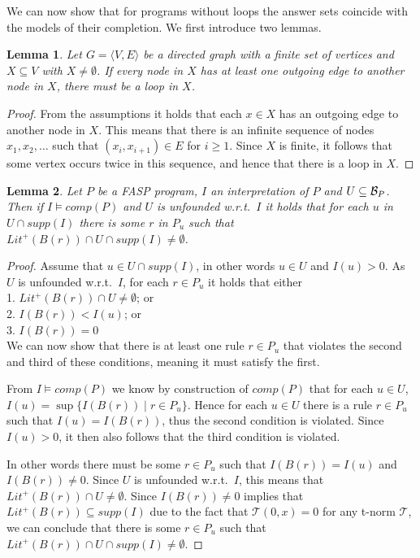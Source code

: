 \documentclass{tlp}
\newcommand{\hbase}[1]{{\ensuremath{{\cal B}_{#1}}}}
\newcommand{\body}[1]{\ensuremath{B(#1)}}
\newcommand{\comp}[1]{\ensuremath{comp(#1)}}
\newcommand{\poslit}[1]{\ensuremath{Lit^{+}(#1)}}
\newcommand{\posbody}[1]{\ensuremath{\poslit{\body{#1}}}}
\newcommand{\supp}[1]{\ensuremath{\mathit{supp}(#1)}}
\newcommand{\pretnorm}{\mathcal{T}}
\newcommand{\tuple}[1]{\ensuremath{\langle{#1}\rangle}}
\newtheorem{lemma}{Lemma}
\begin{document}
We can now show that for programs without loops the answer sets coincide with the models of their completion. We first introduce two lemmas.

\begin{lemma}\label{lem:noloop-modelcomp-is-ansset-1}
 Let $G = \tuple{V,E}$ be a directed graph with a finite set of vertices and $X \subseteq V$ with $X \neq \emptyset$. If every node in $X$ has at least one outgoing edge to another node in $X$, there must be a loop in $X$.
\end{lemma}
\begin{proof}
 From the assumptions it holds that each $x \in X$ has an outgoing edge to another node in $X$. This means that there is an infinite sequence of nodes $x_1,x_2,\ldots$ such that $(x_i,x_{i+1}) \in E$ for $i \geq 1$. Since $X$ is finite, it follows that some vertex occurs twice in this sequence, and hence that there is a loop in $X$.
\end{proof}

\begin{lemma}\label{lem:noloop-modelcomp-is-ansset-2}
 Let $P$ be a FASP program, $I$ an interpretation of $P$ and $U \subseteq \hbase{P}$. Then if $I \models \comp{P}$ and $U$ is unfounded w.r.t.~$I$ it holds that for each $u$ in $U \cap \supp{I}$ there is some $r$ in $P_u$ such that $\posbody{r} \cap U \cap \supp{I} \neq \emptyset$. 
\end{lemma}
\begin{proof}
 Assume that $u \in U \cap \supp{I}$, in other words $u \in U$ and $I(u) > 0$. As $U$ is unfounded w.r.t.~$I$, for each $r \in P_u$ it holds that either\\
\phantom{xx}1. $\posbody{r} \cap U \neq \emptyset$; or\\
   \phantom{xx}2. $I(\body{r}) < I(u)$; or\\
   \phantom{xx}3. $I(\body{r}) = 0$\\
We can now show that there is at least one rule $r \in P_u$ that violates the second and third of these conditions, meaning it must satisfy the first. 
  
  From $I \models \comp{P}$ we know by construction of $\comp{P}$ that for each $u \in U$, $I(u) = \sup \{ I(\body{r}) \mid r \in P_u\}$. Hence for each $u \in U$ there is a rule $r \in P_u$ such that $I(u) = I(\body{r})$, thus the second condition is violated. Since $I(u) > 0$, it then also follows that the third condition is violated.
  
  In other words there must be some $r \in P_u$ such that $I(\body{r}) = I(u)$ and $I(\body{r}) \neq 0$. Since $U$ is unfounded w.r.t.~$I$, this means that $\posbody{r} \cap U \neq \emptyset$. Since $I(\body{r}) \neq 0$ implies that $\posbody{r} \subseteq \supp{I}$ due to the fact that $\pretnorm(0,x) = 0$ for any t-norm $\pretnorm$, we can conclude that there is some $r \in P_u$ such that $\posbody{r} \cap U \cap \supp{I} \neq \emptyset$.
\end{proof}
\end{document}
